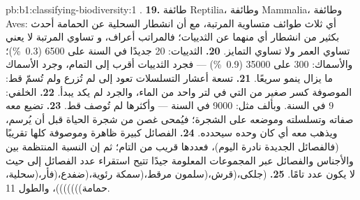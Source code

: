 \begin{solution}{pb:b1:classifying-biodiversity:1}
.
\textbf{19.} طائفة Reptilia، وطائفة Mammalia، وطائفة Aves: أي ثلاث طوائف
متساوية المرتبة، مع أن انشطار السحلية عن الحمامة أحدث بكثير
من انشطار أي منهما عن الثدييات؛ فالمراتب أعراف، و
تساوي المرتبة لا يعني تساوي العمر ولا تساوي التمايز.
\textbf{20.} الثدييات: \num{20} جديدًا في السنة على \num{6500} (\qty{0.3}{\%})؛
والأسماك: \num{300} على \num{35000} (\qty{0.9}{\%}) --- فجرد الثدييات
أقرب إلى التمام، وجرد الأسماك ما يزال ينمو
سريعًا.
\textbf{21.} تسعة أعشار التسلسلات تعود إلى  لم تُزرع
ولم تُسمّ قط:  الموصوفة كسر صغير من
التي في لتر واحد من الماء، والجرد لم يكد يبدأ.
\textbf{22.} الخلفي: \num{9} في السنة. وبألف مثل: \num{9000} في
السنة --- وأكثرها  لم تُوصف قط.
\textbf{23.} تضيع معه صفاته وتسلسلته وموضعه على الشجرة؛
فيُمحى غصن من شجرة الحياة قبل أن يُرسم،
ويذهب معه أي  كان وحده سيحدده.
\textbf{24.} الفصائل كبيرة ظاهرة وموصوفة كلها تقريبًا
(فالفصائل الجديدة نادرة اليوم)، فعددها قريب من التام؛
ثم إن النسبة المنتظمة بين  والأجناس والفصائل عبر
المجموعات المعلومة جيدًا تتيح استقراء عدد الفصائل إلى
 حيث لا يكون عدد  تامًا.
\textbf{25.} (جلكى،(قرش،(سلمون مرقط،(سمكة رئوية،(ضفدع،(فأر،(سحلية،
حمامة)))))))، والطول \num{11}.
\end{solution}
